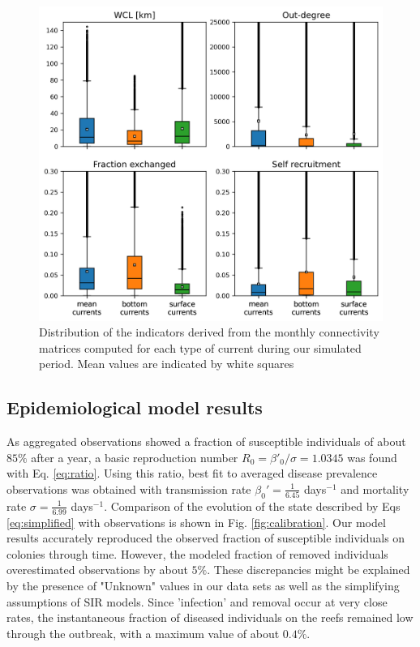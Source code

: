 \documentclass[utf8]{frontiersSCNS}
\begin{document}
\begin{figure}
    \centering
    \includegraphics[width=.8\textwidth]{figures/connect_paper.png}
    \caption{Distribution of the indicators derived from the monthly connectivity matrices computed for each type of current during our simulated period. Mean values are indicated by white squares}
    \label{fig:connect}
\end{figure}

\subsection{Epidemiological model results}

As aggregated observations showed a fraction of susceptible individuals of about $85\%$ after a year, a basic reproduction number $R_0=\beta'_0/\sigma=1.0345$ was found with Eq. \ref{eq:ratio}. Using this ratio, best fit to averaged disease prevalence observations was obtained with transmission rate $\beta_0'=\frac{1}{6.45}$ days$^{-1}$ and mortality rate $\sigma=\frac{1}{6.99}$ days$^{-1}$. Comparison of the evolution of the state described by Eqs \ref{eq:simplified} with observations is shown in Fig. \ref{fig:calibration}. Our model results accurately reproduced the observed fraction of susceptible individuals on colonies through time. However, the modeled fraction of removed individuals overestimated observations by about $5\%$. These discrepancies might be explained by the presence of "Unknown" values in our data sets as well as the simplifying assumptions of SIR models. Since 'infection' and removal occur at very close rates, the instantaneous fraction of diseased individuals on the reefs remained low through the outbreak, with a maximum value of about $0.4\%$.
\end{document}
